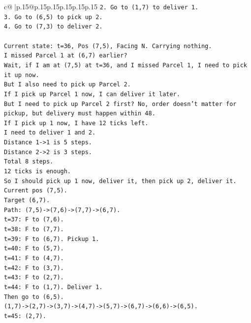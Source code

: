 \documentclass{article}
\begin{document}
{\begin{supertabular}{c@{$\;$}|p{.15\linewidth}@{}p{.15\linewidth}p{.15\linewidth}p{.15\linewidth}p{.15\linewidth}p{.15\linewidth}}
{{{\texttt{2. Go to (1,7) to deliver 1.} \\
\texttt{3. Go to (6,5) to pick up 2.} \\
\texttt{4. Go to (7,3) to deliver 2.} \\
\\ 
\texttt{Current state: t=36, Pos (7,5), Facing N. Carrying nothing.} \\
\texttt{I missed Parcel 1 at (6,7) earlier?} \\
\texttt{Wait, if I am at (7,5) at t=36, and I missed Parcel 1, I need to pick it up now.} \\
\texttt{But I also need to pick up Parcel 2.} \\
\texttt{If I pick up Parcel 1 now, I can deliver it later.} \\
\texttt{But I need to pick up Parcel 2 first? No, order doesn't matter for pickup, but delivery must happen within 48.} \\
\texttt{If I pick up 1 now, I have 12 ticks left.} \\
\texttt{I need to deliver 1 and 2.} \\
\texttt{Distance 1{-}>1 is 5 steps.} \\
\texttt{Distance 2{-}>2 is 3 steps.} \\
\texttt{Total 8 steps.} \\
\texttt{12 ticks is enough.} \\
\texttt{So I should pick up 1 now, deliver it, then pick up 2, deliver it.} \\
\texttt{Current pos (7,5).} \\
\texttt{Target (6,7).} \\
\texttt{Path: (7,5){-}>(7,6){-}>(7,7){-}>(6,7).} \\
\texttt{t=37: F to (7,6).} \\
\texttt{t=38: F to (7,7).} \\
\texttt{t=39: F to (6,7). Pickup 1.} \\
\texttt{t=40: F to (5,7).} \\
\texttt{t=41: F to (4,7).} \\
\texttt{t=42: F to (3,7).} \\
\texttt{t=43: F to (2,7).} \\
\texttt{t=44: F to (1,7). Deliver 1.} \\
\texttt{Then go to (6,5).} \\
\texttt{(1,7){-}>(2,7){-}>(3,7){-}>(4,7){-}>(5,7){-}>(6,7){-}>(6,6){-}>(6,5).} \\
\texttt{t=45: (2,7).} \\
}}}
\end{supertabular}}
\end{document}
